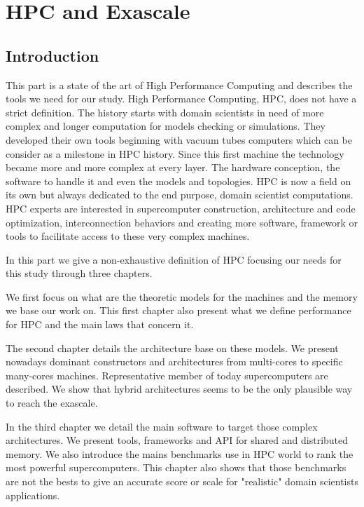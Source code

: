 \part{HPC and Exascale}
\chapter*{Introduction}

This part is a state of the art of High Performance Computing and describes the tools we need for our study. 
High Performance Computing, HPC, does not have a strict definition. 
The history starts with domain scientists in need of more complex and longer computation for models checking or simulations. 
They developed their own tools beginning  with vacuum tubes computers which can be consider as a milestone in HPC history. 
Since this first machine the technology became more and more complex at every layer. 
The hardware conception, the software to handle it and even the models and topologies. 
HPC is now a field on its own but always dedicated to the end purpose, domain scientist computations. 
HPC experts are interested in supercomputer construction, architecture and code optimization, interconnection behaviors and creating more software, framework or tools to facilitate access to these very complex machines. 

In this part we give a non-exhaustive definition of HPC focusing our needs for this study through three chapters. 

We first focus on what are the theoretic models for the machines and the memory we base our work on. 
This first chapter also present what we define performance for HPC and the main laws that concern it. 

The second chapter details the architecture base on these models. 
We present nowadays dominant constructors and architectures from multi-cores to specific many-cores machines. 
Representative member of today supercomputers are described.  
We show that hybrid architectures seems to be the only plausible way to reach the exascale. 

In the third chapter we detail the main software to target those complex architectures. 
We present tools, frameworks and API for shared and distributed memory. 
We also introduce the mains benchmarks use in HPC world to rank the most powerful supercomputers. 
This chapter also shows that those benchmarks are not the bests to give an accurate score or scale for "realistic" domain scientists applications.

